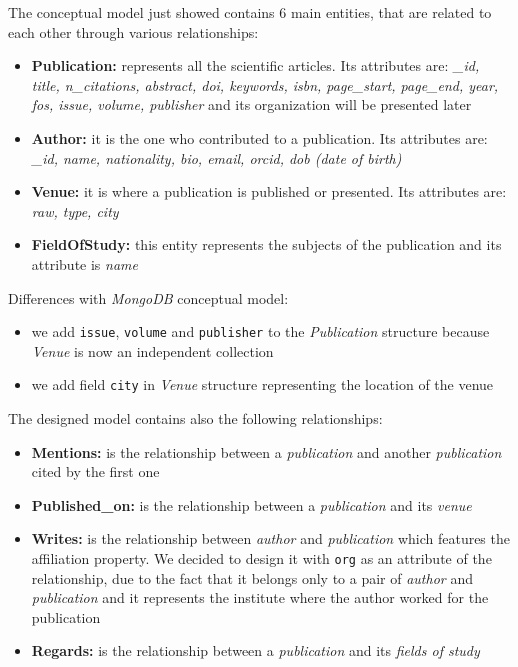 \documentclass{Configuration_Files/PoliMi3i_thesis}
\begin{document}
The conceptual model just showed contains 6 main entities, that are related to each other through various relationships:
\begin{itemize}
    \item \textbf{Publication:} represents all the scientific articles. Its attributes are: \emph{\_id, title, n\_citations,
        abstract, doi, keywords, isbn, page\_start, page\_end, year, fos, issue, volume, publisher} and its
        organization will be presented later
    \item \textbf{Author:} it is the one who contributed to a publication. Its attributes are: \emph{\_id, name, nationality,
        bio, email, orcid, dob (date of birth)}
    \item \textbf{Venue:} it is where a publication is published or presented. Its attributes are: \emph{raw, type,
        city}
    \item \textbf{FieldOfStudy:} this entity represents the subjects of the publication and its attribute is \emph{name}
\end{itemize}
\bigskip
Differences with \emph{MongoDB} conceptual model:
\begin{itemize}
    \item we add \verb|issue|, \verb|volume| and \verb|publisher| to the \emph{Publication} structure because \emph{Venue} is now an
        independent collection
    \item we add field \verb |city| in \emph{Venue} structure representing the location of the venue
\end{itemize}
\bigskip

The designed model contains also the following relationships:
\begin{itemize}
    \item \textbf{Mentions:} is the relationship between a \emph{publication} and another \emph{publication} cited by the first one
    \item \textbf{Published\_on:} is the relationship between a \emph{publication} and its \emph{venue}
    \item \textbf{Writes:} is the relationship between \emph{author} and \emph{publication} which features the affiliation property.
        We decided to design it with \verb |org| as an attribute of the relationship, due to the fact that it belongs
        only to a pair of \emph{author} and \emph{publication} and it represents the institute where the author worked for the publication
    \item \textbf{Regards:} is the relationship between a \emph{publication} and its \emph{fields of study}
\end{itemize}
\end{document}
